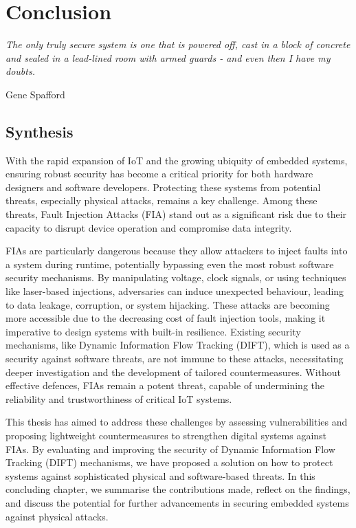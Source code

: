 \chapter{Conclusion}
\label{chapter:conclusion}

\epigraph{\textit{The only truly secure system is one that is powered off, cast in a block of concrete and sealed in a lead-lined room with armed guards - and even then I have my doubts.}}{Gene Spafford}

\minitoc

\section{Synthesis}

With the rapid expansion of IoT and the growing ubiquity of embedded systems, ensuring robust security has become a critical priority for both hardware designers and software developers. Protecting these systems from potential threats, especially physical attacks, remains a key challenge. Among these threats, Fault Injection Attacks (FIA) stand out as a significant risk due to their capacity to disrupt device operation and compromise data integrity.

FIAs are particularly dangerous because they allow attackers to inject faults into a system during runtime, potentially bypassing even the most robust software security mechanisms. By manipulating voltage, clock signals, or using techniques like laser-based injections, adversaries can induce unexpected behaviour, leading to data leakage, corruption, or system hijacking. These attacks are becoming more accessible due to the decreasing cost of fault injection tools, making it imperative to design systems with built-in resilience. Existing security mechanisms, like Dynamic Information Flow Tracking (DIFT), which is used as a security against software threats, are not immune to these attacks, necessitating deeper investigation and the development of tailored countermeasures. Without effective defences, FIAs remain a potent threat, capable of undermining the reliability and trustworthiness of critical IoT systems.

This thesis has aimed to address these challenges by assessing vulnerabilities and proposing lightweight countermeasures to strengthen digital systems against FIAs. By evaluating and improving the security of Dynamic Information Flow Tracking (DIFT) mechanisms, we have proposed a solution on how to protect systems against sophisticated physical and software-based threats. In this concluding chapter, we summarise the contributions made, reflect on the findings, and discuss the potential for further advancements in securing embedded systems against physical attacks.

